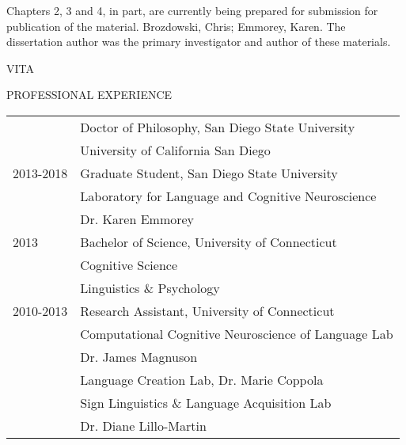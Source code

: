             Chapters 2, 3 and 4, in part, are currently being prepared for submission for publication of the material. Brozdowski, Chris; Emmorey, Karen. The dissertation author was the primary investigator and author of these materials. \par 
            \thispagestyle{plain}
        \newpage
        \thispagestyle{plain}
        \centerline{VITA} \vspace{\baselineskip}
            \noindent PROFESSIONAL EXPERIENCE
            \singlespacing   
            \begin{tabular}{ll} \centering
                2018 & Doctor of Philosophy, San Diego State University \\
                          & \hspace{.25in} University of California San Diego \\ [1ex]

                2013-2018 & Graduate Student, San Diego State University \\
                          & \hspace{.25in} Laboratory for Language and Cognitive Neuroscience\\ & \hspace{.5in} Dr. Karen Emmorey \\ [1ex]

                2013 & Bachelor of Science, University of Connecticut \\  
                          & \hspace{.25in} Cognitive Science \\
                          & \hspace{.25in} Linguistics \& Psychology \\  [1ex]
                2010-2013 & Research Assistant, University of Connecticut \\
                        \linespread{.5} 
                          & \hspace{.25in} Computational Cognitive Neuroscience of Language Lab \\ & \hspace{.5in} Dr. James Magnuson \\
                          & \hspace{.25in} Language Creation Lab, Dr. Marie Coppola \\
                          & \hspace{.25in} Sign Linguistics \& Language Acquisition Lab\\ & \hspace{.5in} Dr. Diane Lillo-Martin 
                
            \end{tabular} 
